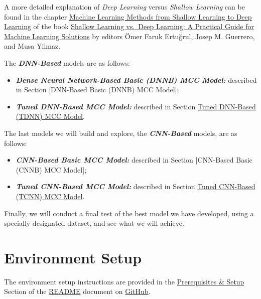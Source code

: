 \documentclass[
]{report}
\providecommand{\tightlist}{%
  \setlength{\itemsep}{0pt}\setlength{\parskip}{0pt}}
\begin{document}
A more detailed explanation of \emph{Deep Learning} versus \emph{Shallow Learning} can be found in the chapter \href{https://link.springer.com/chapter/10.1007/978-3-031-69499-8_1?status=info&saved-doi=10.1007\%2F978-3-031-69499-8_1}{Machine Learning Methods from Shallow Learning to Deep Learning} of the book \href{https://link.springer.com/book/10.1007/978-3-031-69499-8?status=info&saved-doi=10.1007\%2F978-3-031-69499-8}{Shallow Learning vs.~Deep Learning: A Practical Guide for Machine Learning Solutions} by editors Ömer Faruk Ertuğrul, Josep M. Guerrero, and Musa Yilmaz\autocite{Akinci2024}.

The \textbf{\emph{DNN-Based}} models are as follows:

\begin{itemize}
\tightlist
\item
  \textbf{\emph{Dense Neural Network-Based Basic (DNNB) MCC Model:}} described in Section {[}DNN-Based Basic (DNNB) MCC Model{]};
\item
  \textbf{\emph{Tuned DNN-Based MCC Model:}} described in Section \hyperref[tuned-dnn-based-tdnn-mcc-model]{Tuned DNN-Based (TDNN) MCC Model}.
\end{itemize}

The last models we will build and explore, the \textbf{\emph{CNN-Based}} models, are as follows:

\begin{itemize}
\tightlist
\item
  \textbf{\emph{CNN-Based Basic MCC Model:}} described in Section {[}CNN-Based Basic (CNNB) MCC Model{]};
\item
  \textbf{\emph{Tuned CNN-Based MCC Model:}} described in Section \hyperref[tuned-cnn-based-tcnn-mcc-model]{Tuned CNN-Based (TCNN) MCC Model}.
\end{itemize}

Finally, we will conduct a final test of the best model we have developed, using a specially designated dataset, and see what we will achieve.

\newpage

\section{Environment Setup}\label{environment-setup}

\begin{noteblock}
The environment setup instructions are provided in the \href{https://github.com/AzKurban-edX-DS/edx.capstone.choose-your-own/blob/main/README.md\#prerequisites--setup}{Prerequisites \& Setup} Section of the \href{https://github.com/AzKurban-edX-DS/edx.capstone.choose-your-own/blob/main/README.md}{README} document on \href{https://github.com/AzKurban-edX-DS/edx.capstone.choose-your-own}{GitHub}.

\end{noteblock}
\end{document}
